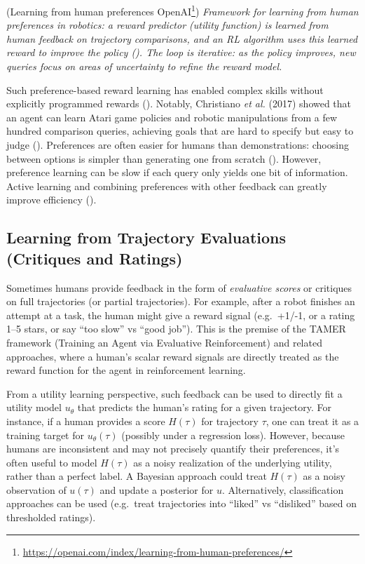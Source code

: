 \documentclass[
  letterpaper,
  numbers=noenddot,
  DIV=11]{scrreprt}
\theoremstyle{plain}
\theoremstyle{definition}
\theoremstyle{remark}
\DeclareRobustCommand{\href}[2]{#2\footnote{\url{#1}}}
\begin{document}
(\href{https://openai.com/index/learning-from-human-preferences/}{Learning
from human preferences \textbar{} OpenAI}) \emph{Framework for learning
from human preferences in robotics: a reward predictor (utility
function) is learned from human feedback on trajectory comparisons, and
an RL algorithm uses this learned reward to improve the policy
(). The loop is
iterative: as the policy improves, new queries focus on areas of
uncertainty to refine the reward model.}

Such preference-based reward learning has enabled complex skills without
explicitly programmed rewards
(). Notably,
Christiano \emph{et al.} (2017) showed that an agent can learn Atari
game policies and robotic manipulations from a few hundred comparison
queries, achieving goals that are hard to specify but easy to judge
(). Preferences
are often easier for humans than demonstrations: choosing between
options is simpler than generating one from scratch
().
However, preference learning can be slow if each query only yields one
bit of information. Active learning and combining preferences with other
feedback can greatly improve efficiency
().

\subsection*{Learning from Trajectory Evaluations (Critiques and
Ratings)}\label{learning-from-trajectory-evaluations-critiques-and-ratings}

Sometimes humans provide feedback in the form of \emph{evaluative
scores} or critiques on full trajectories (or partial trajectories). For
example, after a robot finishes an attempt at a task, the human might
give a reward signal (e.g.~+1/-1, or a rating 1--5 stars, or say ``too
slow'' vs ``good job''). This is the premise of the TAMER framework
(Training an Agent via Evaluative Reinforcement) and related approaches,
where a human's scalar reward signals are directly treated as the reward
function for the agent in reinforcement learning.

From a utility learning perspective, such feedback can be used to
directly fit a utility model \(u_\theta\) that predicts the human's
rating for a given trajectory. For instance, if a human provides a score
\(H(\tau)\) for trajectory \(\tau\), one can treat it as a training
target for \(u_\theta(\tau)\) (possibly under a regression loss).
However, because humans are inconsistent and may not precisely quantify
their preferences, it's often useful to model \(H(\tau)\) as a noisy
realization of the underlying utility, rather than a perfect label. A
Bayesian approach could treat \(H(\tau)\) as a noisy observation of
\(u(\tau)\) and update a posterior for \(u\). Alternatively,
classification approaches can be used (e.g.~treat trajectories into
``liked'' vs ``disliked'' based on thresholded ratings).
\end{document}
